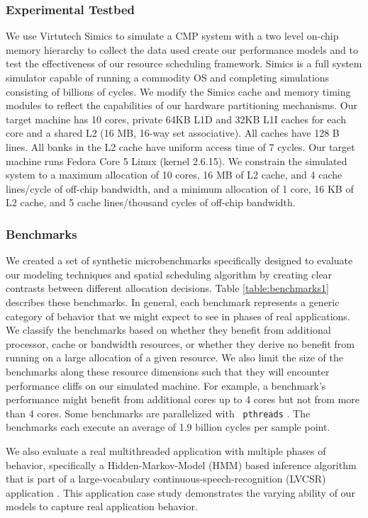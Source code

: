 \subsubsection*{Experimental Testbed}
We use Virtutech Simics \cite{simics} to simulate a CMP system with a two level on-chip memory hierarchy to collect the data used create our performance models and to test the effectiveness of our resource scheduling framework.  Simics is a full system simulator capable of running a commodity OS and completing simulations consisting of billions of cycles. We modify the Simics cache and memory timing modules to reflect the capabilities of our hardware partitioning mechanisms.  Our target machine has 10 cores, private 64KB L1D and 32KB L1I caches for each core and a shared L2 (16 MB, 16-way set associative).  All caches have 128 B lines.   All banks in the L2 cache have uniform access time of 7 cycles.  Our target machine runs Fedora Core 5 Linux (kernel 2.6.15). We constrain the simulated system to a maximum allocation of 10 cores, 16 MB of L2 cache, and 4 cache lines/cycle of off-chip bandwidth, and a minimum allocation of 1 core, 16 KB of L2 cache, and 5 cache lines/thousand cycles of off-chip bandwidth.

\subsubsection*{Benchmarks}
We created a set of synthetic microbenchmarks specifically designed to evaluate our modeling techniques and spatial scheduling algorithm by creating clear contrasts between different allocation decisions.  Table \ref{table:benchmarks1} describes these benchmarks.  In general, each benchmark represents a generic category of behavior that we might expect to see in phases of real applications.  We classify the benchmarks based on whether they benefit from additional processor, cache or bandwidth resources, or whether they derive no benefit from running on a large allocation of a given resource.  We also limit the size of the benchmarks along these resource dimensions such that they will encounter performance cliffs on our simulated machine.  For example, a benchmark's performance might benefit from additional cores up to 4 cores but not from more than 4 cores.   Some benchmarks are parallelized with \texttt{ pthreads} \cite{pthreads}.  The benchmarks each execute an average of 1.9 billion cycles per sample point.

We also evaluate a real multithreaded application with multiple phases of behavior, specifically
a Hidden-Markov-Model (HMM) based inference algorithm that is part of a large-vocabulary continuous-speech-recognition (LVCSR) application \cite{chong-eama08, huang-speech}. This application case study demonstrates the varying ability of our models to capture real application behavior.

